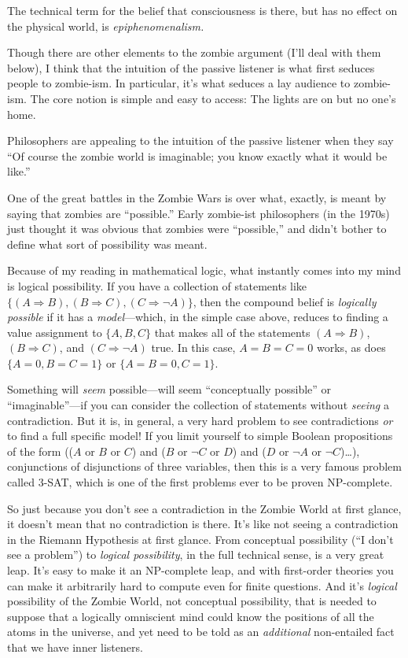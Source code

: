 {
 The technical term for the belief that consciousness is there, but
has no effect on the physical world, is \textit{epiphenomenalism.}}

{
 Though there are other elements to the zombie argument
(I'll deal with them below), I think that the intuition
of the passive listener is what first seduces people to zombie-ism. In
particular, it's what seduces a lay audience to
zombie-ism. The core notion is simple and easy to access: The lights
are on but no one's home.}

{
 Philosophers are appealing to the intuition of the passive
listener when they say ``Of course the zombie world is
imaginable; you know exactly what it would be
like.''}

{
 One of the great battles in the Zombie Wars is over what, exactly,
is meant by saying that zombies are
``possible.'' Early zombie-ist
philosophers (in the 1970s) just thought it was obvious that zombies
were ``possible,'' and
didn't bother to define what sort of possibility was
meant.}

{
 Because of my reading in mathematical logic, what instantly comes
into my mind is logical possibility. If you have a collection of
statements like $\{(A \Rightarrow 
B),(B \Rightarrow  C),(C \Rightarrow
\lnot A)\}$, then the compound
belief is \textit{logically possible} if it has a
\textit{model}{}---which, in the simple case above, reduces to finding
a value assignment to
$\{A,B,C\}$
that makes all of the statements $(A \Rightarrow  B)$, $(B \Rightarrow
 C)$, and $(C \Rightarrow \lnot A)$ true. In this case, $A = B = C
= 0$ works, as does $\{A = 0,B = C =
1\}$ or
$\{A = B = 0,C =
1\}$.}

{
 Something will \textit{seem} possible---will seem
``conceptually possible'' or
``imaginable''---if you can consider
the collection of statements without \textit{seeing} a contradiction.
But it is, in general, a very hard problem to see contradictions
\textit{or} to find a full specific model! If you limit yourself to
simple Boolean propositions of the form (($A$ or $B$ or $C$) and ($B$ or
$\lnot C$ or $D$) and ($D$ or $\lnot A$ or $\lnot C$){\dots}),
conjunctions of disjunctions of three variables, then this is a very
famous problem called \textsf{3-SAT}, which is one of the first problems ever to
be proven \textsf{NP}-complete.}

{
 So just because you don't see a contradiction in
the Zombie World at first glance, it doesn't mean that
no contradiction is there. It's like not seeing a
contradiction in the Riemann Hypothesis at first glance. From
conceptual possibility (``I don't see
a problem'') to \textit{logical possibility}, in the
full technical sense, is a very great leap. It's easy
to make it an \textsf{NP}-complete leap, and with first-order theories you can
make it arbitrarily hard to compute even for finite questions. And
it's \textit{logical} possibility of the Zombie World,
not conceptual possibility, that is needed to suppose that a logically
omniscient mind could know the positions of all the atoms in the
universe, and yet need to be told as an \textit{additional}
non-entailed fact that we have inner listeners.}

